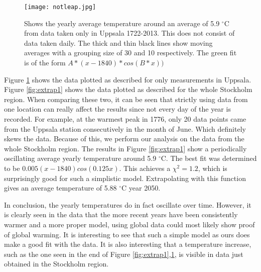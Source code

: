 \begin{figure}[h!]
\begin{center}
\texttt{[image: notleap.jpg]}
\caption{\label{fig:extrap2}Shows the yearly average temperature around an average of 5.9 $^{\circ}$C from data taken only in Uppsala 1722-2013. This does not consist of data taken daily. The thick and thin black lines show moving averages with a grouping size of 30 and 10 respectively. The green fit is of the form $A*(x-1840)*cos(B*x))$}
\end{center}
\end{figure}

Figure \ref{fig:extrap2} shows the data plotted as described for only measurements in Uppsala. Figure \ref{fig:extrap1} shows the data plotted as described for the whole Stockholm region. When comparing these two, it can be seen that strictly using data from one location can really affect the results since not every day of the year is recorded. For example, at the warmest peak in 1776, only 20 data points came from the Uppsala station consecutively in the month of June. Which definitely skews the data. Because of this, we perform our analysis on the data from the whole Stockholm region. The results in Figure \ref{fig:extrap1} show a periodically oscillating average yearly temperature around 5.9 $^{\circ}$C. The best fit was determined to be $0.005(x-1840)cos(0.125x)$. This achieves a $\chi ^2=1.2$, which is surprisingly good for such a simplistic model. Extrapolating with this function gives an average temperature of 5.88 $^{\circ}$C year 2050. 

In conclusion, the yearly temperatures do in fact oscillate over time. However, it is clearly seen in the data that the more recent years have been consistently warmer and a more proper model, using global data could most likely show proof of global warming. It is interesting to see that such a simple model as ours does make a good fit with the data. It is also interesting that a temperature increase, such as the one seen in the end of Figure \ref{fig:extrap1},\ref{fig:extrap2}, is visible in data just obtained in the Stockholm region.







